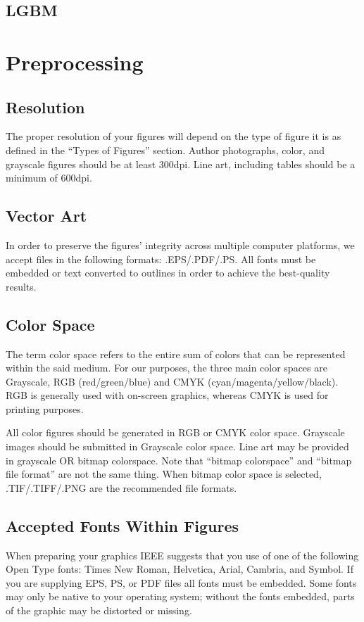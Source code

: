 \documentclass[journal,twoside,web]{ieeecolor}
\begin{document}
\subsection{LGBM}

\section{Preprocessing}






\subsection{Resolution }
The proper resolution of your figures will depend on the type of figure it 
is as defined in the ``Types of Figures'' section. Author photographs, 
color, and grayscale figures should be at least 300dpi. Line art, including 
tables should be a minimum of 600dpi.

\subsection{Vector Art}
In order to preserve the figures' integrity across multiple computer 
platforms, we accept files in the following formats: .EPS/.PDF/.PS. All 
fonts must be embedded or text converted to outlines in order to achieve the 
best-quality results.

\subsection{Color Space}
The term color space refers to the entire sum of colors that can be 
represented within the said medium. For our purposes, the three main color 
spaces are Grayscale, RGB (red/green/blue) and CMYK 
(cyan/magenta/yellow/black). RGB is generally used with on-screen graphics, 
whereas CMYK is used for printing purposes.

All color figures should be generated in RGB or CMYK color space. Grayscale 
images should be submitted in Grayscale color space. Line art may be 
provided in grayscale OR bitmap colorspace. Note that ``bitmap colorspace'' 
and ``bitmap file format'' are not the same thing. When bitmap color space 
is selected, .TIF/.TIFF/.PNG are the recommended file formats.

\subsection{Accepted Fonts Within Figures}
When preparing your graphics IEEE suggests that you use of one of the 
following Open Type fonts: Times New Roman, Helvetica, Arial, Cambria, and 
Symbol. If you are supplying EPS, PS, or PDF files all fonts must be 
embedded. Some fonts may only be native to your operating system; without 
the fonts embedded, parts of the graphic may be distorted or missing.
\end{document}
